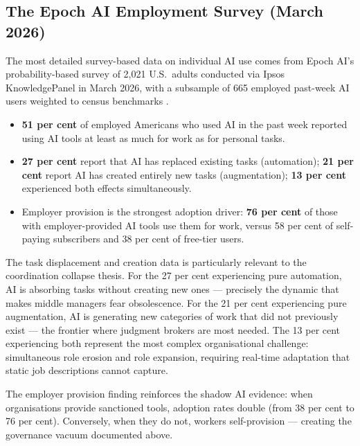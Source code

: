 \subsection{The Epoch AI Employment Survey (March 2026)}

The most detailed survey-based data on individual AI use comes from Epoch AI's probability-based survey of 2,021 U.S.\ adults conducted via Ipsos KnowledgePanel in March 2026, with a subsample of 665 employed past-week AI users weighted to census benchmarks \parencite{EpochAI2026}.

\begin{evidencebox}[title={AI as Mainstream Work Tool (Epoch AI, March 2026)}]
\begin{itemize}
  \item \textbf{51 per cent} of employed Americans who used AI in the past week reported using AI tools at least as much for work as for personal tasks.
  \item \textbf{27 per cent} report that AI has replaced existing tasks (automation); \textbf{21 per cent} report AI has created entirely new tasks (augmentation); \textbf{13 per cent} experienced both effects simultaneously.
  \item Employer provision is the strongest adoption driver: \textbf{76 per cent} of those with employer-provided AI tools use them for work, versus 58 per cent of self-paying subscribers and 38 per cent of free-tier users.
\end{itemize}
\end{evidencebox}

The task displacement and creation data is particularly relevant to the coordination collapse thesis. For the 27 per cent experiencing pure automation, AI is absorbing tasks without creating new ones --- precisely the dynamic that makes middle managers fear obsolescence. For the 21 per cent experiencing pure augmentation, AI is generating new categories of work that did not previously exist --- the frontier where judgment brokers are most needed. The 13 per cent experiencing both represent the most complex organisational challenge: simultaneous role erosion and role expansion, requiring real-time adaptation that static job descriptions cannot capture.

The employer provision finding reinforces the shadow AI evidence: when organisations provide sanctioned tools, adoption rates double (from 38 per cent to 76 per cent). Conversely, when they do not, workers self-provision --- creating the governance vacuum documented above.

